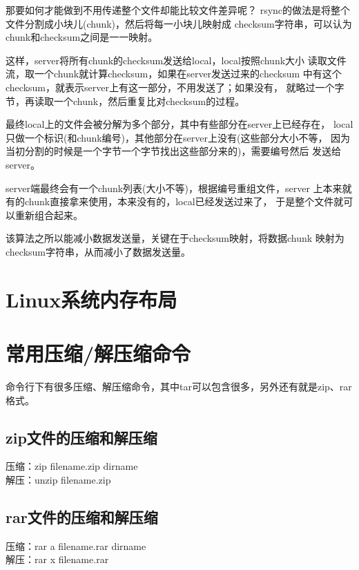 \documentclass[a4paper,11pt]{article}
\begin{document}
  那要如何才能做到不用传递整个文件却能比较文件差异呢？
  rsync的做法是将整个文件分割成小块儿(chunk)，然后将每一小块儿映射成
  checksum字符串，可以认为chunk和checksum之间是一一映射。

  这样，server将所有chunk的checksum发送给local，local按照chunk大小
  读取文件流，取一个chunk就计算checksum，如果在server发送过来的checksum
  中有这个checksum，就表示server上有这一部分，不用发送了；如果没有，
  就略过一个字节，再读取一个chunk，然后重复比对checksum的过程。

  最终local上的文件会被分解为多个部分，其中有些部分在server上已经存在，
  local只做一个标识(和chunk编号)，其他部分在server上没有(这些部分大小不等，
  因为当初分割的时候是一个字节一个字节找出这些部分来的)，需要编号然后
  发送给server。

  server端最终会有一个chunk列表(大小不等)，根据编号重组文件，server
  上本来就有的chunk直接拿来使用，本来没有的，local已经发送过来了，
  于是整个文件就可以重新组合起来。

  该算法之所以能减小数据发送量，关键在于checksum映射，将数据chunk
  映射为checksum字符串，从而减小了数据发送量。


  \section[Linux系统内存布局]{Linux系统内存布局}
  


  \section[常用压缩/解压缩命令]{常用压缩/解压缩命令}
  命令行下有很多压缩、解压缩命令，其中tar可以包含很多，另外还有就是zip、rar格式。
  \subsection[zip文件的压缩和解压缩]{zip文件的压缩和解压缩}
  压缩：zip filename.zip dirname\\
  解压：unzip filename.zip
  \subsection[rar文件的压缩和解压缩]{rar文件的压缩和解压缩}
  压缩：rar a filename.rar dirname\\
  解压：rar x filename.rar
\end{document}
